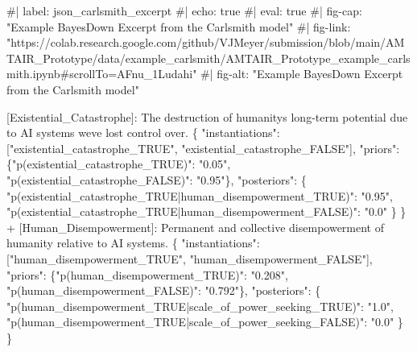 \documentclass[
  11pt,
  letterpaper,
  openany]{book}
\newenvironment{Shaded}{\begin{snugshade}}{\end{snugshade}}
\newcommand{\DataTypeTok}[1]{\textcolor[rgb]{0.68,0.00,0.00}{#1}}
\newcommand{\ErrorTok}[1]{\textcolor[rgb]{0.68,0.00,0.00}{#1}}
\newcommand{\FunctionTok}[1]{\textcolor[rgb]{0.28,0.35,0.67}{#1}}
\newcommand{\OtherTok}[1]{\textcolor[rgb]{0.00,0.23,0.31}{#1}}
\newcommand{\StringTok}[1]{\textcolor[rgb]{0.13,0.47,0.30}{#1}}
\begin{document}
\begin{landscape}
\begin{Shaded}
\begin{Highlighting}[]
\ErrorTok{\#|} \ErrorTok{label:} \ErrorTok{json\_carlsmith\_excerpt}
\ErrorTok{\#|} \ErrorTok{echo:} \ErrorTok{true}
\ErrorTok{\#|} \ErrorTok{eval:} \ErrorTok{true}
\ErrorTok{\#|} \ErrorTok{fig{-}cap:} \ErrorTok{"Example} \ErrorTok{BayesDown} \ErrorTok{Excerpt} \ErrorTok{from} \ErrorTok{the} \ErrorTok{Carlsmith} \ErrorTok{model"}
\ErrorTok{\#|} \ErrorTok{fig{-}link:} \ErrorTok{"https://colab.research.google.com/github/VJMeyer/submission/blob/main/AMTAIR\_Prototype/data/example\_carlsmith/AMTAIR\_Prototype\_example\_carlsmith.ipynb\#scrollTo=AFnu\_1Ludahi"}
\ErrorTok{\#|} \ErrorTok{fig{-}alt:} \ErrorTok{"Example} \ErrorTok{BayesDown} \ErrorTok{Excerpt} \ErrorTok{from} \ErrorTok{the} \ErrorTok{Carlsmith} \ErrorTok{model"}



\OtherTok{[}\ErrorTok{Existential\_Catastrophe}\OtherTok{]}\ErrorTok{:} \ErrorTok{The} \ErrorTok{destruction} \ErrorTok{of} \ErrorTok{humanity\textquotesingle{}s} \ErrorTok{long{-}term} \ErrorTok{potential} \ErrorTok{due} \ErrorTok{to} \ErrorTok{AI} \ErrorTok{systems} \ErrorTok{we\textquotesingle{}ve} \ErrorTok{lost} \ErrorTok{control} \ErrorTok{over.} \FunctionTok{\{}
  \DataTypeTok{"instantiations"}\FunctionTok{:} \OtherTok{[}\StringTok{"existential\_catastrophe\_TRUE"}\OtherTok{,} \StringTok{"existential\_catastrophe\_FALSE"}\OtherTok{]}\FunctionTok{,}
  \DataTypeTok{"priors"}\FunctionTok{:} \FunctionTok{\{}\DataTypeTok{"p(existential\_catastrophe\_TRUE)"}\FunctionTok{:} \StringTok{"0.05"}\FunctionTok{,} \DataTypeTok{"p(existential\_catastrophe\_FALSE)"}\FunctionTok{:} \StringTok{"0.95"}\FunctionTok{\},}
  \DataTypeTok{"posteriors"}\FunctionTok{:} \FunctionTok{\{}
    \DataTypeTok{"p(existential\_catastrophe\_TRUE|human\_disempowerment\_TRUE)"}\FunctionTok{:} \StringTok{"0.95"}\FunctionTok{,}
    \DataTypeTok{"p(existential\_catastrophe\_TRUE|human\_disempowerment\_FALSE)"}\FunctionTok{:} \StringTok{"0.0"}
  \FunctionTok{\}}
\FunctionTok{\}}
 \ErrorTok{+} \OtherTok{[}\ErrorTok{Human\_Disempowerment}\OtherTok{]}\ErrorTok{:} \ErrorTok{Permanent} \ErrorTok{and} \ErrorTok{collective} \ErrorTok{disempowerment} \ErrorTok{of} \ErrorTok{humanity} \ErrorTok{relative} \ErrorTok{to} \ErrorTok{AI} \ErrorTok{systems.} \FunctionTok{\{}
   \DataTypeTok{"instantiations"}\FunctionTok{:} \OtherTok{[}\StringTok{"human\_disempowerment\_TRUE"}\OtherTok{,} \StringTok{"human\_disempowerment\_FALSE"}\OtherTok{]}\FunctionTok{,}
   \DataTypeTok{"priors"}\FunctionTok{:} \FunctionTok{\{}\DataTypeTok{"p(human\_disempowerment\_TRUE)"}\FunctionTok{:} \StringTok{"0.208"}\FunctionTok{,} \DataTypeTok{"p(human\_disempowerment\_FALSE)"}\FunctionTok{:} \StringTok{"0.792"}\FunctionTok{\},}
   \DataTypeTok{"posteriors"}\FunctionTok{:} \FunctionTok{\{}
     \DataTypeTok{"p(human\_disempowerment\_TRUE|scale\_of\_power\_seeking\_TRUE)"}\FunctionTok{:} \StringTok{"1.0"}\FunctionTok{,}
     \DataTypeTok{"p(human\_disempowerment\_TRUE|scale\_of\_power\_seeking\_FALSE)"}\FunctionTok{:} \StringTok{"0.0"}
   \FunctionTok{\}}
 \FunctionTok{\}}
\end{Highlighting}
\end{Shaded}


\end{landscape}
\end{document}
